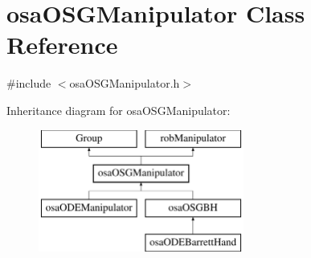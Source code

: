 \hypertarget{classosa_o_s_g_manipulator}{\section{osa\-O\-S\-G\-Manipulator Class Reference}
\label{classosa_o_s_g_manipulator}
}


{\ttfamily \#include $<$osa\-O\-S\-G\-Manipulator.\-h$>$}

Inheritance diagram for osa\-O\-S\-G\-Manipulator\-:\begin{figure}[H]
\begin{center}
\leavevmode
\includegraphics[height=4.000000cm]{d3/d78/classosa_o_s_g_manipulator}
\end{center}
\end{figure}
